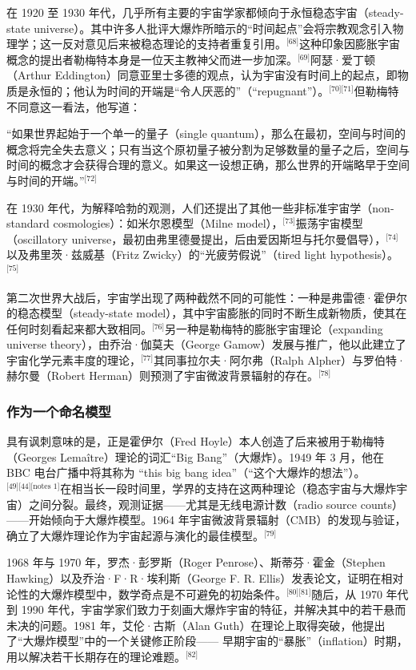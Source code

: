 在 1920 至 1930 年代，几乎所有主要的宇宙学家都倾向于永恒稳态宇宙（steady-state universe）。其中许多人批评大爆炸所暗示的“时间起点”会将宗教观念引入物理学；这一反对意见后来被稳态理论的支持者重复引用。\(^\text{[68]}\)这种印象因膨胀宇宙概念的提出者勒梅特本身是一位天主教神父而进一步加深。\(^\text{[69]}\)阿瑟·爱丁顿（Arthur Eddington）同意亚里士多德的观点，认为宇宙没有时间上的起点，即物质是永恒的；他认为时间的开端是“令人厌恶的”（“repugnant”）。\(^\text{[70][71]}\)但勒梅特不同意这一看法，他写道：  

“如果世界起始于一个单一的量子（single quantum），那么在最初，空间与时间的概念将完全失去意义；只有当这个原初量子被分割为足够数量的量子之后，空间与时间的概念才会获得合理的意义。如果这一设想正确，那么世界的开端略早于空间与时间的开端。”\(^\text{[72]}\) 

在 1930 年代，为解释哈勃的观测，人们还提出了其他一些非标准宇宙学（non-standard cosmologies）：如米尔恩模型（Milne model），\(^\text{[73]}\)振荡宇宙模型（oscillatory universe，最初由弗里德曼提出，后由爱因斯坦与托尔曼倡导），\(^\text{[74]}\)以及弗里茨·兹威基（Fritz Zwicky）的“光疲劳假说”（tired light hypothesis）。\(^\text{[75]}\)  

第二次世界大战后，宇宙学出现了两种截然不同的可能性：一种是弗雷德·霍伊尔的稳态模型（steady-state model），其中宇宙膨胀的同时不断生成新物质，使其在任何时刻看起来都大致相同。\(^\text{[76]}\)另一种是勒梅特的膨胀宇宙理论（expanding universe theory），由乔治·伽莫夫（George Gamow）发展与推广，他以此建立了宇宙化学元素丰度的理论，\(^\text{[77]}\)其同事拉尔夫·阿尔弗（Ralph Alpher）与罗伯特·赫尔曼（Robert Herman）则预测了宇宙微波背景辐射的存在。\(^\text{[78]}\)
\subsubsection{作为一个命名模型}
具有讽刺意味的是，正是霍伊尔（Fred Hoyle）本人创造了后来被用于勒梅特（Georges Lemaître）理论的词汇“Big Bang”（大爆炸）。1949 年 3 月，他在 BBC 电台广播中将其称为 “this big bang idea”（“这个大爆炸的想法”）。\(^\text{[49][44][notes 1]}\)在相当长一段时间里，学界的支持在这两种理论（稳态宇宙与大爆炸宇宙）之间分裂。最终，观测证据——尤其是无线电源计数（radio source counts）——开始倾向于大爆炸模型。1964 年宇宙微波背景辐射（CMB）的发现与验证，确立了大爆炸理论作为宇宙起源与演化的最佳模型。\(^\text{[79]}\)

1968 年与 1970 年，罗杰·彭罗斯（Roger Penrose）、斯蒂芬·霍金（Stephen Hawking）以及乔治·F·R·埃利斯（George F. R. Ellis）发表论文，证明在相对论性的大爆炸模型中，数学奇点是不可避免的初始条件。\(^\text{[80][81]}\)随后，从 1970 年代到 1990 年代，宇宙学家们致力于刻画大爆炸宇宙的特征，并解决其中的若干悬而未决的问题。1981 年，艾伦·古斯（Alan Guth）在理论上取得突破，他提出了“大爆炸模型”中的一个关键修正阶段—— 早期宇宙的“暴胀”（inflation）时期，用以解决若干长期存在的理论难题。\(^\text{[82]}\)

